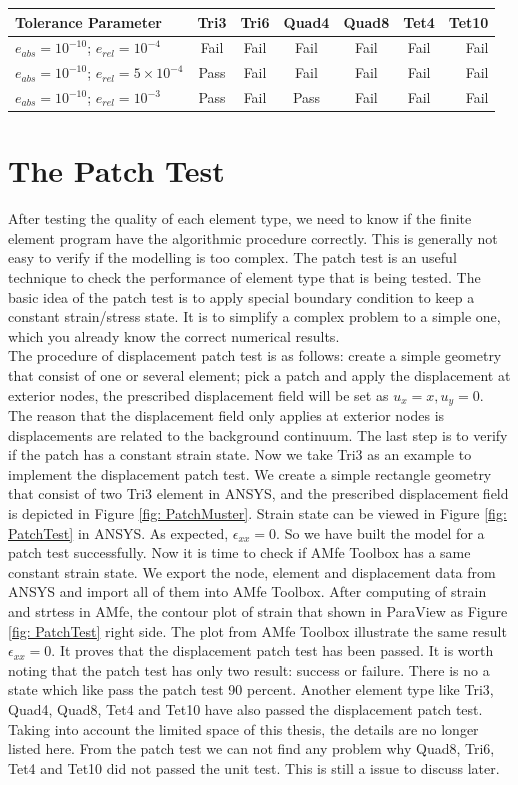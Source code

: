 \begin{tabular}{l*{5}{c}r} \label{tab: error}
	Tolerance Parameter              & Tri3 & Tri6 & Quad4 & Quad8 & Tet4  & Tet10  \\
	\hline
	$e_{abs}=10^{-10}$; $e_{rel}=10^{-4}$ & Fail & Fail & Fail & Fail & Fail & Fail   \\
	$e_{abs}=10^{-10}$; $e_{rel}=5\times10^{-4}$&  Pass& Fail & Fail & Fail & Fail &  Fail  \\
	$e_{abs}=10^{-10}$; $e_{rel}=10^{-3}$ & Pass & Fail & Pass & Fail &  Fail & Fail   \\
   \hline
\end{tabular}


\section{The Patch Test}
After testing the quality of each element type, we need to know if the finite element program have the algorithmic procedure correctly. This is generally not easy to verify if the modelling is too complex. The patch test is an useful technique to check the performance of element type that is being tested. The basic idea of the patch test is to apply special boundary condition to keep a constant strain/stress state. It is to simplify a complex problem to a simple one, which you already know the correct numerical results. \\
The procedure of displacement patch test is as follows: create a simple geometry that consist of one or several element; pick a patch and apply the displacement at exterior nodes, the prescribed displacement field will be set as $u_x = x, u_y = 0$. The reason that the displacement field only applies at exterior nodes is displacements are related to the background continuum. The last step is to verify if the patch has a constant strain state. Now we take Tri3 as an example to implement the displacement patch test. We create a simple rectangle geometry that consist of two Tri3 element in ANSYS, and the prescribed displacement field is depicted in Figure \ref{fig: PatchMuster}. Strain state can be viewed in Figure \ref{fig: PatchTest} in ANSYS. As expected, $\epsilon_{xx} = 0$. So we have built the model for a patch test successfully. Now it is time to check if AMfe Toolbox has a same constant strain state. We export the node, element and displacement data from ANSYS and import all of them into AMfe Toolbox. After computing of strain and strtess in AMfe, the contour plot of strain that shown in ParaView as Figure \ref{fig: PatchTest} right side. The plot from AMfe Toolbox illustrate the same result $\epsilon_ {xx} = 0$. It proves that the displacement patch test has been passed. It is worth noting that the patch test has only two result: success or failure. There is no a state which like pass the patch test 90 percent. Another element type like Tri3, Quad4, Quad8, Tet4 and Tet10 have also passed the displacement patch test. Taking into account the limited space of this thesis, the details are no longer listed here. From the patch test we can not find any problem why Quad8, Tri6, Tet4 and Tet10 did not passed the unit test. This is still a issue to discuss later.

